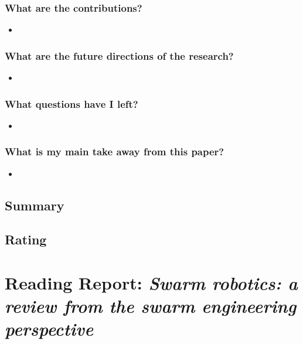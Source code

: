 \documentclass{article}
\begin{document}
\subsubsection*{What are the contributions?}
\begin{itemize}
    \item 
\end{itemize}
\subsubsection*{What are the future directions of the research?}
\begin{itemize}
    \item 
\end{itemize}
\subsubsection*{What questions have I left?}
\begin{itemize}
    \item 
\end{itemize}
\subsubsection*{What is my main take away from this paper?}
\begin{itemize}
    \item 
\end{itemize}

\subsection*{Summary}

\subsection*{Rating}



\section{Reading Report: \emph{Swarm robotics: a review from the swarm engineering perspective}}
\cite{Brambilla2013}
\end{document}
